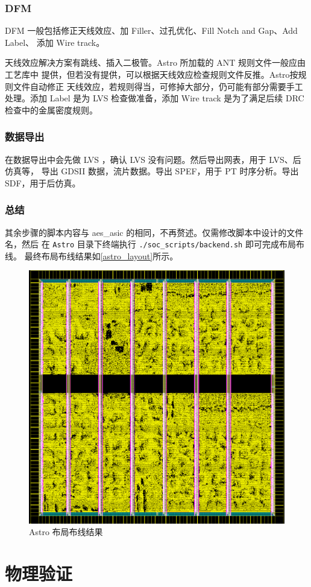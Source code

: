 \documentclass[12pt,hyperref,a4paper,UTF8]{ctexart}
\begin{document}
\subsubsection{DFM}
DFM 一般包括修正天线效应、加 Filler、过孔优化、Fill Notch and Gap、Add Label、
添加 Wire track。

天线效应解决方案有跳线、插入二极管。Astro 所加载的 ANT 规则文件一般应由工艺库中
提供，但若没有提供，可以根据天线效应检查规则文件反推。Astro按规则文件自动修正
天线效应，若规则得当，可修掉大部分，仍可能有部分需要手工处理。添加 Label 是为
 LVS 检查做准备，添加 Wire track 是为了满足后续 DRC 检查中的金属密度规则。

\subsubsection{数据导出}
在数据导出中会先做 LVS ，确认 LVS 没有问题。然后导出网表，用于 LVS、后仿真等，
导出 GDSII 数据，流片数据。导出 SPEF，用于 PT 时序分析。导出 SDF，用于后仿真。

\subsubsection{总结}
其余步骤的脚本内容与 aes\_asic 的相同，不再赘述。仅需修改脚本中设计的文件名，然后
在 \texttt{Astro} 目录下终端执行 \texttt{./soc\_scripts/backend.sh} 即可完成布局布线。
最终布局布线结果如\autoref{astro_layout}所示。

\begin{figure}[htbp]
    \centering
    \includegraphics[width =.5\textwidth]{figures/astro_layout.png}
    \caption{Astro 布局布线结果}
    \label{astro_layout}
\end{figure}

\newpage
\section{物理验证}
\end{document}
